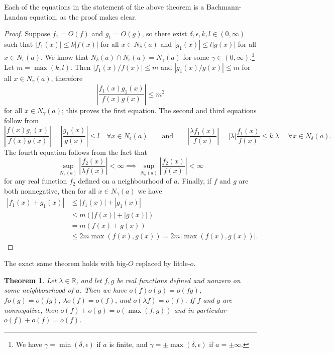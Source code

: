 \documentclass[9pt]{report}
\newtheorem{theorem}{Theorem}
\theoremstyle{definition}
\newcommand\RR{\mathbb R}
\newcommand\abs[1]{\left\lvert#1\right\rvert}
\begin{document}
Each of the equations in the statement of the above theorem is a Bachmann-Landau equation, as the proof makes clear.

\begin{proof}
    Suppose \(f_1 = O(f)\) and \(g_1 = O(g)\), so there exist \(\delta,\epsilon,k,l\in(0,\infty)\) such that \(\abs{f_1(x)} \leq k\abs{f(x)}\) for all \(x\in N_{\delta}(a)\) and \(\abs{g_1(x)} \leq l\abs{g(x)}\) for all \(x\in N_{\epsilon}(a)\).
    We know that \(N_{\delta}(a) \cap N_{\epsilon}(a) = N_{\gamma}(a)\) for some \(\gamma\in(0,\infty)\).\footnote{We have \(\gamma = \min(\delta,\epsilon)\) if \(a\) is finite, and \(\gamma = \pm\max(\delta,\epsilon)\) if \(a=\pm\infty\).}
    Let \(m=\max(k,l)\).
    Then \(\abs{f_1(x)/f(x)} \leq m\) and \(\abs{g_1(x)/g(x)} \leq m\) for all \(x\in N_{\gamma}(a)\), therefore
    \[\abs{\frac{f_1(x)g_1(x)}{f(x)g(x)}} \leq m^2\]
    for all \(x\in N_{\gamma}(a)\); this proves the first equation.
    The second and third equations follow from
    \[\abs{\frac{f(x)g_1(x)}{f(x)g(x)}} = \abs{\frac{g_1(x)}{g(x)}} \leq l\quad\forall x\in N_{\epsilon}(a) \qquad \text{and} \qquad \abs{\frac{\lambda f_1(x)}{f(x)}} = \abs{\lambda}\frac{f_1(x)}{f(x)} \leq k\abs{\lambda}\quad\forall x\in N_{\delta}(a).\]
    The fourth equation follows from the fact that
    \[\sup_{N_{\kappa}(a)} \abs{\frac{f_2(x)}{\lambda f(x)}} < \infty \implies \sup_{N_{\kappa}(a)} \abs{\frac{f_2(x)}{f(x)}} < \infty\]
    for any real function \(f_2\) defined on a neighbourhood of \(a\).
    Finally, if \(f\) and \(g\) are both nonnegative, then for all \(x\in N_{\gamma}(a)\) we have
    \begin{align*}
        \abs{f_1(x)+g_1(x)} &\leq \abs{f_1(x)} + \abs{g_1(x)} \\
        &\leq m(\abs{f(x)} + \abs{g(x)}) \\
        &= m(f(x)+g(x)) \\
        &\leq 2m\max(f(x),g(x)) = 2m\abs{\max(f(x), g(x))}.
    \end{align*}
\end{proof}

The exact same theorem holds with big-$O$ replaced by little-$o$.

\begin{theorem}
    Let \(\lambda\in\RR\), and let \(f,g\) be real functions defined and nonzero on some neighbourhood of \(a\).
    Then we have \(o(f)o(g) = o(fg)\), \(fo(g) = o(fg)\), \(\lambda o(f) = o(f)\), and \(o(\lambda f) = o(f)\).
    If \(f\) and \(g\) are nonnegative, then \(o(f) + o(g) = o(\max(f, g))\) and in particular \(o(f) + o(f) = o(f)\).
\end{theorem}
\end{document}

